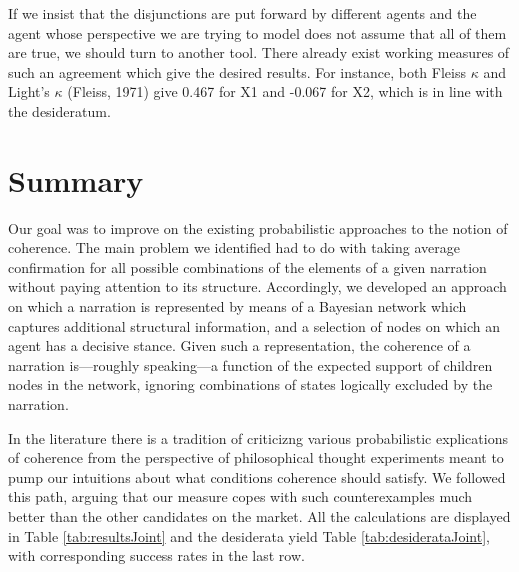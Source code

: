 \documentclass[
  10pt,
]{scrartcl}
\newcommand{\s}[1]{\textsf{#1}}
\begin{document}
If we insist that the disjunctions are put forward by different agents and the agent whose perspective we are trying to model does not assume that all of them are true, we should turn to another tool. There already exist working measures of such an agreement which give the desired results. For instance, both Fleiss \(\kappa\) and Light's \(\kappa\) (Fleiss, 1971) give 0.467 for \s{X1} and -0.067 for \s{X2}, which is in line with the desideratum.

\hypertarget{summary}{%
\section{\texorpdfstring{Summary \label{sec:discussion}}{Summary }}\label{summary}}

Our goal was to improve on the existing probabilistic approaches to the notion of coherence. The main problem we identified had to do with taking average confirmation for all possible combinations of the elements of a given narration without paying attention to its structure. Accordingly, we developed an approach on which a narration is represented by means of a Bayesian network which captures additional structural information, and a selection of nodes on which an agent has a decisive stance. Given such a representation, the coherence of a narration is---roughly speaking---a function of the expected support of children nodes in the network, ignoring combinations of states logically excluded by the narration.

In the literature there is a tradition of criticizng various probabilistic explications of coherence from the perspective of philosophical thought experiments meant to pump our intuitions about what conditions coherence should satisfy. We followed this path, arguing that our measure copes with such counterexamples much better than the other candidates on the market. All the calculations are displayed in Table \ref{tab:resultsJoint} and the desiderata yield Table \ref{tab:desiderataJoint}, with corresponding success rates in the last row.
\end{document}
